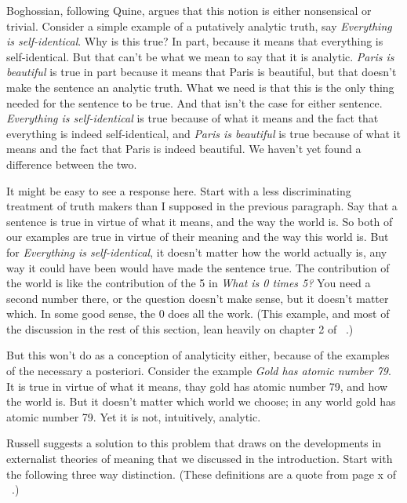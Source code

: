 Boghossian, following Quine, argues that this notion is either nonsensical or trivial. Consider a simple example of a putatively analytic truth, say \emph{Everything is self-identical}. Why is this true? In part, because it means that everything is self-identical. But that can't be what we mean to say that it is analytic. \emph{Paris is beautiful} is true in part because it means that Paris is beautiful, but that doesn't make the sentence an analytic truth. What we need is that this is the only thing needed for the sentence to be true. And that isn't the case for either sentence. \emph{Everything is self-identical} is true because of what it means and the fact that everything is indeed self-identical, and \emph{Paris is beautiful} is true because of what it means and the fact that Paris is indeed beautiful. We haven't yet found a difference between the two.

It might be easy to see a response here. Start with a less discriminating treatment of truth makers than I supposed in the previous paragraph. Say that a sentence is true in virtue of what it means, and the way the world is. So both of our examples are true in virtue of their meaning and the way this world is. But for \emph{Everything is self-identical}, it doesn't matter how the world actually is, any way it could have been would have made the sentence true. The contribution of the world is like the contribution of the 5 in \emph{What is 0 times 5?} You need a second number there, or the question doesn't make sense, but it doesn't matter which. In some good sense, the 0 does all the work. (This example, and most of the discussion in the rest of this section, lean heavily on chapter 2 of ~\citep{Russell2008}.)

But this won't do as a conception of analyticity either, because of the examples of the necessary a posteriori. Consider the example \emph{Gold has atomic number 79}. It is true in virtue of what it means, thay gold has atomic number 79, and how the world is. But it doesn't matter which world we choose; in any world gold has atomic number 79. Yet it is not, intuitively, analytic.

Russell suggests a solution to this problem that draws on the developments in externalist theories of meaning that we discussed in the introduction. Start with the following three way distinction. (These definitions are a quote from page x of ~\citep{Russell2008}.)

